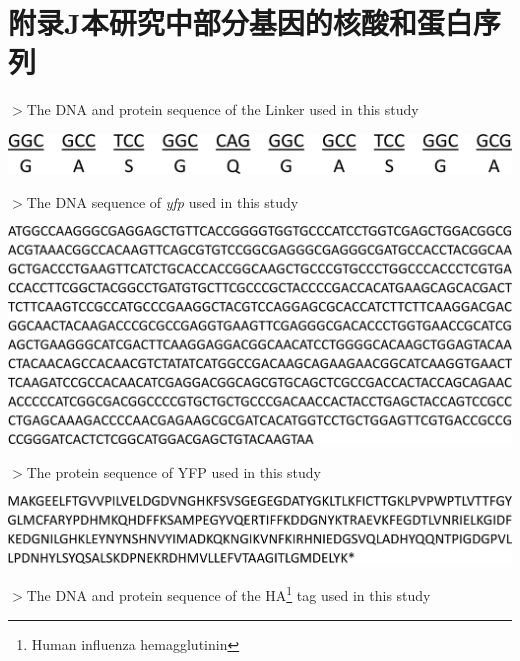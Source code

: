 \chapter{附录J\quad 本研究中部分基因的核酸和蛋白序列}\label{appen:J}
\renewcommand{\leftmark}{附录J\quad 本研究中部分基因的核酸和蛋白序列}
\noindent $>$The DNA and protein sequence of the Linker used in this study
\vspace{2mm}

\graphicspath{{figures/}}
\noindent \includegraphics[width=\textwidth-45mm]{figJ-3.jpg}

\noindent $>$The DNA sequence of \textit{yfp} used in this study
\vspace{2mm}

\graphicspath{{figures/}}
\noindent \includegraphics[width=\textwidth]{figJ-1.jpg}

\noindent $>$The protein sequence of YFP used in this study
\vspace{2mm}

\graphicspath{{figures/}}
\noindent \includegraphics[width=\textwidth]{figJ-2.jpg}

\noindent $>$The DNA and protein sequence of the HA\footnote{Human influenza hemagglutinin} tag used in this study
\vspace{2mm}


